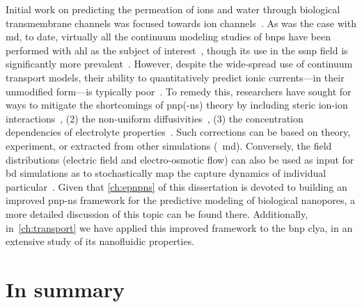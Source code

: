 Initial work on predicting the permeation of ions and water through biological transmembrane channels was
focused towards ion channels~\cite{Eisenberg-1996,Chen-1997,Corry-2003}. As was the case with \gls{md}, to
date, virtually all the continuum modeling studies of \glspl{bnp} have been performed with \gls{ahl} as the
subject of
interest~\cite{Noskov-2004,Cozmuta-2005,OKeeffe-2007,Simakov-2010,Pederson-2015,Simakov-2018,Aguilella-Arzo-2020},
though its use in the \gls{ssnp} field is significantly more
prevalent~\cite{Daiguji-2004,Cervera-2005,White-2008,Lu-2012,Chaudhry-2014,Laohakunakorn-2015,Hulings-2018,Rigo-2019,Melnikov-2020}.
However, despite the wide-spread use of continuum transport models, their ability to quantitatively predict
ionic currents---in their unmodified form---is typically poor~\cite{Corry-2000,Collins-2012}. To remedy this,
researchers have sought for ways to mitigate the shortcomings of \gls{pnp}(-\gls{ns}) theory by including
steric ion-ion interactions~\cite{Kilic-2007,Lu-2011,Liu-2020}, (2) the non-uniform
diffusivities~\cite{Cozmuta-2005,Furini-2006,Simakov-2010,}, (3) the concentration dependencies of electrolyte
properties~\cite{Baldessari-2008-1,Burger-2012,Chen-2016}. Such corrections can be based on theory,
experiment, or extracted from other simulations (\eg~\gls{md}). Conversely, the field distributions (electric
field and electro-osmotic flow) can also be used as input for \gls{bd} simulations as to stochastically map
the capture dynamics of individual particular~\cite{Pederson-2015,Hulings-2018}. Given that \cref{ch:epnpns}
of this dissertation is devoted to building an improved \gls{pnp-ns} framework for the predictive modeling of
biological nanopores, a more detailed discussion of this topic can be found there. Additionally,
in~\cref{ch:transport} we have applied this improved framework to the \gls{bnp} \gls{clya}, in an extensive
study of its nanofluidic properties.



\section{In summary}
%

